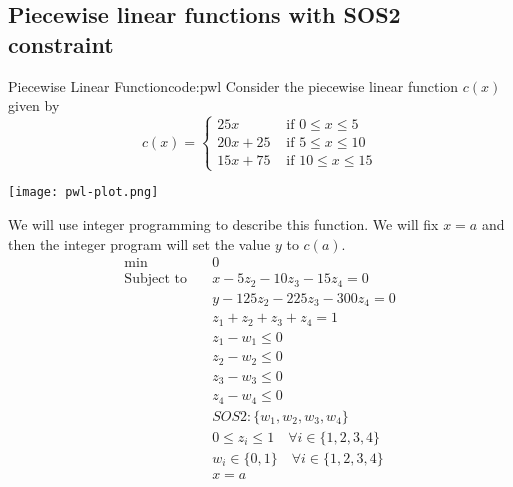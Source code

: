 \documentclass[../open-optimization/open-optimization.tex]{subfiles}
\begin{document}
\subsection{Piecewise linear functions with SOS2 constraint}
\begin{examplewithcode}{Piecewise Linear Function}{code:pwl}
\label{example:pwl}
Consider the piecewise linear function 
 $c(x)$ given by
$$
c(x) = 
\begin{cases}
25x  & \text{ if } 0 \leq x \leq 5\\
20x + 25 & \text{ if } 5 \leq x \leq 10\\
15x + 75 & \text{ if } 10 \leq x \leq 15
\end{cases}
$$
\begin{center}
\texttt{[image: pwl-plot.png]}
\end{center}
We will use integer programming to describe this function.  We will fix $x = a$ and then the integer program will set the value $y$ to $c(a)$.
\begin{align*}
\min\quad & 0\\
\text{Subject to} \quad & x - 5 z_{2} - 10 z_{3} - 15 z_{4} = 0\\
 & y - 125 z_{2} - 225 z_{3} - 300 z_{4} = 0\\
 & z_{1} + z_{2} + z_{3} + z_{4} = 1\\
 & z_{1} - w_{1} \leq 0\\
 & z_{2} - w_{2} \leq 0\\
 & z_{3} - w_{3} \leq 0\\
 & z_{4} - w_{4} \leq 0\\
 & SOS2: \{w_1, w_2, w_3, w_4\}\\
 & 0 \leq z_{i} \leq 1 \quad\forall i \in \{1,2,3,4\}\\
 & w_{i} \in \{0,1\} \quad\forall i \in \{1,2,3,4\}\\
 & x = a\\
\end{align*}

\end{examplewithcode}
\end{document}
